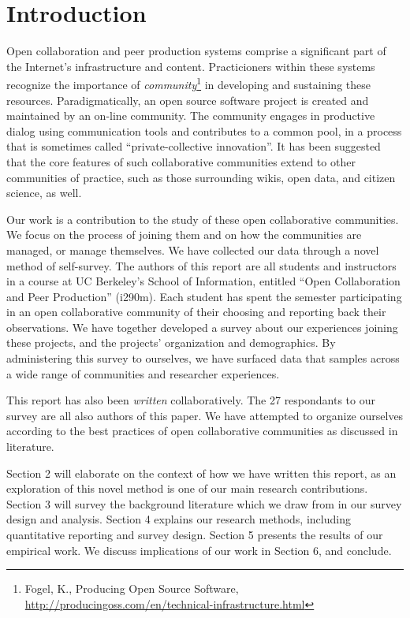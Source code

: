 \section{Introduction}

Open collaboration and peer production systems comprise a significant
part of the Internet's infrastructure and content.
Practicioners within these systems recognize the importance of
\emph{community}\footnote{Fogel, K., Producing Open Source Software, \url{http://producingoss.com/en/technical-infrastructure.html}} in developing and sustaining these resources.
Paradigmatically, an open source software project is created and maintained by an on-line community.
The community engages in productive dialog using communication tools and contributes to
a common pool\cite{ostrom1990}, in a process that is sometimes called ``private-collective innovation''.\cite{vonhippel2003oss}
It has been suggested that the core features of such collaborative
communities extend to other communities of practice, such as those
surrounding wikis, open data, and citizen science, as well.

Our work is a contribution to the study of these open collaborative
communities.
We focus on the process of joining them and on how
the communities are managed, or manage themselves.
We have collected our data through a novel method of self-survey. 
The authors of this report are all students and instructors in a
course at UC Berkeley's School of Information, entitled ``Open Collaboration and Peer Production'' (i290m).
Each student has spent the semester participating in an open
collaborative community of their choosing and reporting back
their observations.
We have together developed a survey about our experiences joining
these projects, and the projects' organization and demographics.
By administering this survey to ourselves, we have surfaced data
that samples across a wide range of communities and researcher experiences.

This report has also been \emph{written} collaboratively.
The 27 respondants to our survey are all also authors of this paper.
We have attempted to organize ourselves according
to the best practices of open collaborative communities as discussed in literature.


Section 2 will elaborate on the context of how we have written this report, as an exploration of this novel method is one of our main research contributions.
Section 3 will survey the background literature which we draw from in
our survey design and analysis.
Section 4 explains our research methods, including quantitative
reporting and survey design.
Section 5 presents the results of our empirical work.
We discuss implications of our work in Section 6, and conclude. 


